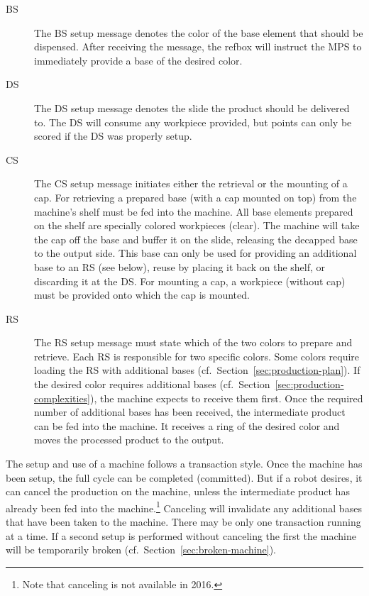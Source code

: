 \documentclass[12pt,twoside]{article}
\newcommand{\refsec}[1]{Section~\ref{#1}}
\begin{document}
\begin{description}
\item[BS] The BS setup message denotes the color of the base element
  that should be dispensed. After receiving the message, the refbox
  will instruct the MPS to immediately provide a base of the desired
  color.
\item[DS] The DS setup message denotes the slide the product should be
  delivered to. The DS will consume any workpiece provided, but points
  can only be scored if the DS was properly setup.
\item[CS] The CS setup message initiates either the retrieval or the
  mounting of a cap. For retrieving a prepared base (with a cap
  mounted on top) from the machine's shelf must be fed into the
  machine. All base elements prepared on the shelf are specially
  colored workpieces (clear). The machine will take the cap off the
  base and buffer it on the slide, releasing the decapped base to the
  output side. This base can only be used for providing an additional
  base to an RS (see below), reuse by placing it back on the shelf, or
  discarding it at the DS.  For mounting a cap, a workpiece (without
  cap) must be provided onto which the cap is mounted.
\item[RS] The RS setup message must state which of the two colors to
  prepare and retrieve. Each RS is responsible for two specific
  colors. Some colors require loading the RS with additional bases
  (cf.~\refsec{sec:production-plan}). If the desired color requires
  additional bases (cf.~\refsec{sec:production-complexities}), the
  machine expects to receive them first. Once the required number of
  additional bases has been received, the intermediate product can be
  fed into the machine. It receives a ring of the desired color and
  moves the processed product to the output.
\end{description}

\noindent
The setup and use of a machine follows a transaction style. Once the
machine has been setup, the full cycle can be completed (committed).
But if a robot desires, it can cancel the production on the machine,
unless the intermediate product has already been fed into the
machine.\footnote{Note that canceling is not available in 2016.}
Canceling will invalidate any additional bases that have been taken to
the machine. There may be only one transaction running at a time. If a
second setup is performed without canceling the first the machine will
be temporarily broken (cf.~\refsec{sec:broken-machine}).
\end{document}
